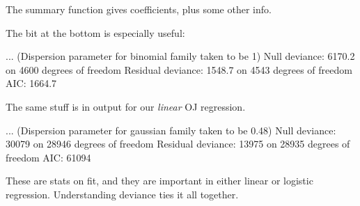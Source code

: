 \documentclass[11pt,xcolor=svgnames]{beamer}
\newcommand{\theme}{\color{Maroon}}
\newcommand{\br}{\color{SaddleBrown}}
\newcommand{\nv}{\color{Navy}}
\begin{document}


\begin{frame}[fragile]

{The summary function gives coefficients, plus some other info.}

The bit at the bottom is especially useful:

\begin{semiverbatim}\footnotesize
\nv{summary(spammy)}\br ...
(Dispersion parameter for binomial family taken to be 1)
    Null deviance: 6170.2  on 4600  degrees of freedom
Residual deviance: 1548.7  on 4543  degrees of freedom
AIC: 1664.7
\end{semiverbatim}

The same stuff is in output for our {\it linear} OJ regression.
\begin{semiverbatim}\footnotesize
\nv{summary(ojreg)}\br ...
(Dispersion parameter for gaussian family taken to be 0.48)
    Null deviance: 30079  on 28946  degrees of freedom
Residual deviance: 13975  on 28935  degrees of freedom
AIC: 61094
\end{semiverbatim}

These are stats on fit, and they are important in either linear or logistic regression.  Understanding {\theme deviance} ties it all together.
\end{frame}
\end{document}
